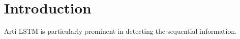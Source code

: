 \section{Introduction}
Arti
LSTM is particularly prominent in detecting the sequential information. 